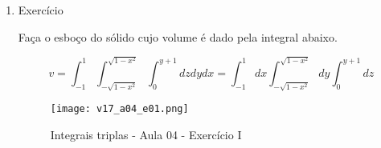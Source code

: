 \begin{enumerate}
	\item Exercício
	
	Faça o esboço do sólido cujo volume é dado pela integral abaixo.
	
	\begin{equation*}
		v = \int_{-1}^1 \int_{-\sqrt{1 - x^2}}^{\sqrt{1 - x^2}} \int_0^{y + 1} dzdydx = \int_{-1}^1 dx \int_{-\sqrt{1 - x^2}}^{\sqrt{1 - x^2}} dy \int_0^{y + 1} dz
	\end{equation*}
	
	\begin{figure}[htb]
		\caption{Integrais triplas - Aula 04 - Exercício I}
		\label{v17_a04_e01}
		\centering
		\texttt{[image: v17\_a04\_e01.png]}		
	\end{figure}
	

\end{enumerate}
